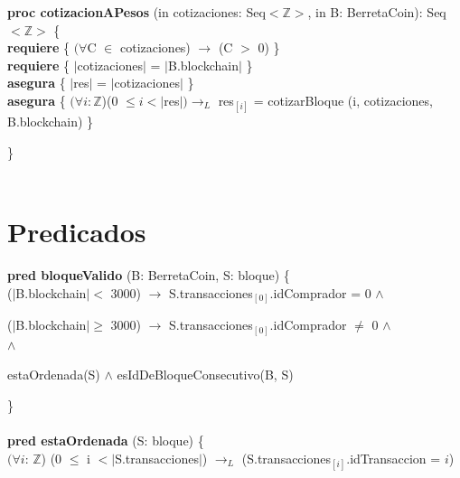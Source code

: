 \documentclass{article}
\newcommand{\Entero}{$\mathds{Z}$}
\begin{document}
    \textbf{proc cotizacionAPesos} (in cotizaciones: Seq$<$\Entero$>$, in B: BerretaCoin): Seq$<$\Entero$>$ \{\\
        \indent\indent \textbf{requiere} \{ $(\forall$C $\in$ cotizaciones) $\rightarrow$ (C $>$ 0) \}\\

        \indent\indent \textbf{requiere} \{ $|$cotizaciones$|$ = $|$B.blockchain$|$ \}\\

        \indent\indent \textbf{asegura} \{ $|$res$|$ = $|$cotizaciones$|$ \}\\

        \indent\indent \textbf{asegura} \{ $(\forall i: $\Entero)(0 $\le i < |$res$|)\rightarrow_{L}$ res$_{[i]}$ = cotizarBloque (i, cotizaciones, B.blockchain) \}

    \}\\\\

    







\newpage
\section*{Predicados}

    \textbf{pred bloqueValido} (B: BerretaCoin, S: bloque) \{\\
        \indent\indent ($|$B.blockchain$|<$ 3000) $\rightarrow$ S.transacciones$_{[0]}$.idComprador = 0 $\land$

        \indent\indent ($|$B.blockchain$|\ge$ 3000) $\rightarrow$ S.transacciones$_{[0]}$.idComprador $\ne$ 0 $\land$\\

        \indent\indent[($\forall$ transaccion $\in$ S.transacciones) $\rightarrow_{L}$ [(transaccion.idComprador $\ne$ transaccion.idVendedor) $\land$

        \indent\indent(transaccion.id $>$ 0 $\land$ transaccion.idComprador $\ge$ 0 $\land$ transaccion.idVendedor $>$ 0 $\land$ transaccion.monto $>$ 0)] $\land$

        \indent\indent estaOrdenada(S) $\land$ esIdDeBloqueConsecutivo(B, S)

    \}\\\\

    \textbf{pred estaOrdenada} (S: bloque) \{\\
        \indent\indent $(\forall i$: \Entero) (0 $\le$ i $< |$S.transacciones$|$) $\rightarrow_{L}$ (S.transacciones$_{[i]}$.idTransaccion = $i$)
\end{document}
